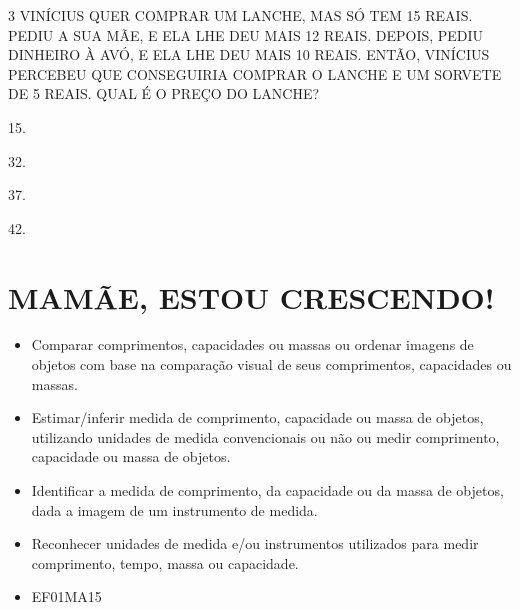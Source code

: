 \pagebreak
\num{3} VINÍCIUS QUER COMPRAR UM LANCHE, MAS SÓ TEM 15 REAIS. PEDIU A SUA MÃE, E
ELA LHE DEU MAIS 12 REAIS. DEPOIS, PEDIU DINHEIRO À AVÓ, E ELA
LHE DEU MAIS 10 REAIS. ENTÃO, VINÍCIUS PERCEBEU QUE CONSEGUIRIA COMPRAR O LANCHE E UM SORVETE DE 5 REAIS. QUAL É O PREÇO DO LANCHE?

\begin{escolha}
\item
  15.
\item
  32.
\item
  37.
\item
  42.
\end{escolha}

\chapter{MAMÃE, ESTOU CRESCENDO!}



\begin{itemize}
\item
  Comparar comprimentos, capacidades ou massas ou ordenar imagens de
  objetos com base na comparação visual de seus comprimentos,
  capacidades ou massas.
\item
  Estimar/inferir medida de comprimento, capacidade ou massa de objetos,
  utilizando unidades de medida convencionais ou não ou medir
  comprimento, capacidade ou massa de objetos.
\item
  Identificar a medida de comprimento, da capacidade ou da massa de
  objetos, dada a imagem de um instrumento de medida.
\item
  Reconhecer unidades de medida e/ou instrumentos utilizados para medir
  comprimento, tempo, massa ou capacidade.
\end{itemize}


\begin{itemize}
\item EF01MA15
\end{itemize}




